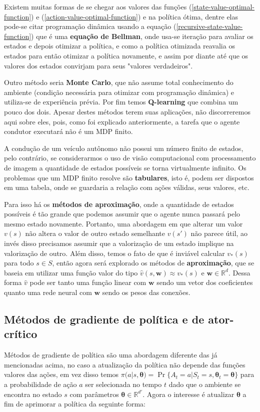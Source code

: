Existem muitas formas de se chegar aos valores das funções (\ref{state-value-optimal-function}) e (\ref{action-value-optimal-function}) e na política ótima, dentre elas pode-se citar programação dinâmica usando a equação (\ref{recursive-state-value-function}) que é uma \textbf{equação de Bellman}, onde usa-se iteração para avaliar os estados e depois otimizar a política, e como a política otimizada reavalia os estados para então otimizar a política novamente, e assim por diante até que os valores dos estados convirjam para seus "valores verdadeiros". 

Outro método seria \textbf{Monte Carlo}, que não assume total conhecimento do ambiente (condição necessária para otimizar com programação dinâmica) e utiliza-se de experiência prévia. Por fim temos \textbf{Q-learning} que combina um pouco dos dois. Apesar destes métodos terem suas aplicações, não discorreremos aqui sobre eles, pois, como foi explicado anteriormente, a tarefa que o agente condutor executará não é um MDP finito. 

A condução de um veículo autônomo não possui um número finito de estados, pelo contrário, se considerarmos o uso de visão computacional com processamento de imagem a quantidade de estados possíveis se torna virtualmente infinito. Os problemas que um MDP finito resolve são \textbf{tabulares}, isto é, podem ser dispostos em uma tabela, onde se guardaria a relação com ações válidas, seus valores, etc.

Para isso há os \textbf{métodos de aproximação}, onde a quantidade de estados possíveis é tão grande que podemos assumir que o agente nunca passará pelo mesmo estado novamente. Portanto, uma abordagem em que alterar um valor $v(s)$ não altera o valor de outro estado semelhante $v(s')$ não parece útil, ao invés disso precisamos assumir que a valorização de um estado implique na valorização de outro. Além disso, temos o fato de que é inviável calcular  $v_\ast(s)$ para todo $s \in S$, então agora será explorado os métodos de \textbf{aproximação}, que se baseia em utilizar uma função valor do tipo $\hat{v}(s, \mathbf{w}) \approx v_\ast(s)$ e $\mathbf{w} \in \mathbb{R}^d$. Dessa forma $\hat{v}$ pode ser tanto uma função linear com $\mathbf{w}$ sendo um vetor dos coeficientes quanto uma rede neural com $\mathbf{w}$ sendo os pesos das conexões.

\subsection{Métodos de gradiente de política e de ator-crítico}
Métodos de gradiente de política são uma abordagem diferente das já mencionadas acima, no caso a atualização da política não depende das funções valores das ações, em vez disso temos $\pi(a|s, \mathbf{\theta}) = \Pr\{A_t = a | S_t = s, \mathbf{\theta}_t = \mathbf{\theta}\}$ para  a probabilidade de ação $a$ ser selecionada  no tempo $t$ dado que o ambiente se encontra no estado $s$ com parâmetros $\mathbf{\theta} \in \mathbb{R}^{d'}$. Agora o interesse é atualizar $\mathbf{\theta}$ a fim de aprimorar a política da seguinte forma:

